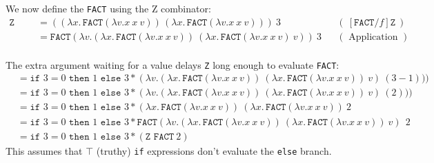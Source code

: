 \begin{Example}
    
    We now define the \texttt{FACT} using the Z combinator:
    \begin{align*}
        \texttt{Z FACT 3} & = ((\lambda x.\, \texttt{FACT} (\lambda v.x\ x\ v))\, (\lambda x.\, \texttt{FACT} (\lambda v.x\ x\ v)))\ 3 && (\ [\texttt{FACT}/f]\texttt{Z}\ )\\
        & = \texttt{FACT} (\lambda v.(\lambda x.\, \texttt{FACT} (\lambda v.x\ x\ v))\ (\lambda x.\, \texttt{FACT} (\lambda v.x\ x\ v)\ v))\ 3 && ( \text{ Application }) \\
    \end{align*}

    \vspace{-1em}
    \noindent
    The extra argument waiting for a value delays \texttt{Z} long enough to evaluate \texttt{FACT}:
    \begin{align*}
        &= \texttt{if } 3 = 0 \texttt{ then } 1 \texttt{ else } 3 * (\lambda v.(\lambda x.\, \texttt{FACT} (\lambda v.x\ x\ v))\ (\lambda x.\, \texttt{FACT} (\lambda v.x\ x\ v))\ v)\ (3 - 1))) \\
        &= \texttt{if } 3 = 0 \texttt{ then } 1 \texttt{ else } 3 * (\lambda v.(\lambda x.\, \texttt{FACT} (\lambda v.x\ x\ v))\ (\lambda x.\, \texttt{FACT} (\lambda v.x\ x\ v))\ v)\ (2))) \\
        &= \texttt{if } 3 = 0 \texttt{ then } 1 \texttt{ else } 3 * (\lambda x.\, \texttt{FACT} (\lambda v.x\ x\ v))\ (\lambda x.\, \texttt{FACT} (\lambda v.x\ x\ v))\ 2 \\
        &= \texttt{if } 3 = 0 \texttt{ then } 1 \texttt{ else } 3 * \texttt{FACT} (\lambda v.(\lambda x.\, \texttt{FACT} (\lambda v.x\ x\ v))\ (\lambda x.\, \texttt{FACT} (\lambda v.x\ x\ v))\ v)\ \ 2 \\
        &= \texttt{if } 3 = 0 \texttt{ then } 1 \texttt{ else } 3 * (\texttt{Z FACT} \ 2)
    \end{align*}
    \noindent
    This assumes that $\top$ (truthy) \texttt{if} expressions don't evaluate the \texttt{else} branch.
\end{Example}
\noindent

\newpage 

